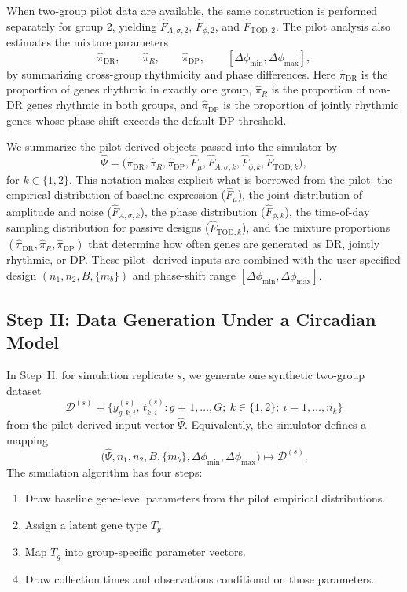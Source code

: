 \documentclass{article}
\begin{document}
When two-group pilot data are available, the same construction is performed
separately for group 2, yielding $\hat{F}_{A,\sigma,2}$, $\hat{F}_{\phi,2}$,
and $\hat{F}_{\mathrm{TOD},2}$. The pilot analysis also estimates the mixture
parameters
\[
\hat{\pi}_{\mathrm{DR}},\qquad \hat{\pi}_R,\qquad
\hat{\pi}_{\mathrm{DP}},\qquad
[\Delta\phi_{\min},\Delta\phi_{\max}],
\]
by summarizing cross-group rhythmicity and phase differences. Here
$\hat{\pi}_{\mathrm{DR}}$ is the proportion of genes rhythmic in exactly one
group, $\hat{\pi}_R$ is the proportion of non-DR genes rhythmic in both groups,
and $\hat{\pi}_{\mathrm{DP}}$ is the proportion of jointly rhythmic genes whose
phase shift exceeds the default DP threshold.

We summarize the pilot-derived objects passed into the simulator by
\[
\hat{\Psi}
=
\bigl(
\hat{\pi}_{\mathrm{DR}},\hat{\pi}_R,\hat{\pi}_{\mathrm{DP}},
\hat{F}_{\mu},\hat{F}_{A,\sigma,k},\hat{F}_{\phi,k},\hat{F}_{\mathrm{TOD},k}
\bigr),
\]
for $k\in\{1,2\}$. This notation makes explicit what is borrowed from the pilot:
the empirical distribution of baseline expression ($\hat{F}_\mu$), the joint
distribution of amplitude and noise ($\hat{F}_{A,\sigma,k}$), the phase
distribution ($\hat{F}_{\phi,k}$), the time-of-day sampling distribution for
passive designs ($\hat{F}_{\mathrm{TOD},k}$), and the mixture proportions
$(\hat{\pi}_{\mathrm{DR}},\hat{\pi}_R,\hat{\pi}_{\mathrm{DP}})$ that determine
how often genes are generated as DR, jointly rhythmic, or DP. These pilot-
derived inputs are combined with the user-specified design
$(n_1,n_2,B,\{m_b\})$ and phase-shift range
$[\Delta\phi_{\min},\Delta\phi_{\max}]$.

\subsection{Step II: Data Generation Under a Circadian Model}
\label{sec:generative}

In Step~II, for simulation replicate $s$, we generate one synthetic two-group
dataset
\[
\mathcal{D}^{(s)}=\bigl\{y_{g,k,i}^{(s)},\,t_{k,i}^{(s)}:
g=1,\ldots,G;\ k\in\{1,2\};\ i=1,\ldots,n_k\bigr\}
\]
from the pilot-derived input vector $\hat{\Psi}$. Equivalently, the simulator
defines a mapping
\[
\bigl(\hat{\Psi},n_1,n_2,B,\{m_b\},\Delta\phi_{\min},\Delta\phi_{\max}\bigr)
\longmapsto \mathcal{D}^{(s)}.
\]
The simulation algorithm has four steps:
\begin{enumerate}
\item Draw baseline gene-level parameters from the pilot empirical
distributions.
\item Assign a latent gene type $T_g$.
\item Map $T_g$ into group-specific parameter vectors.
\item Draw collection times and observations conditional on those parameters.
\end{enumerate}
\end{document}
